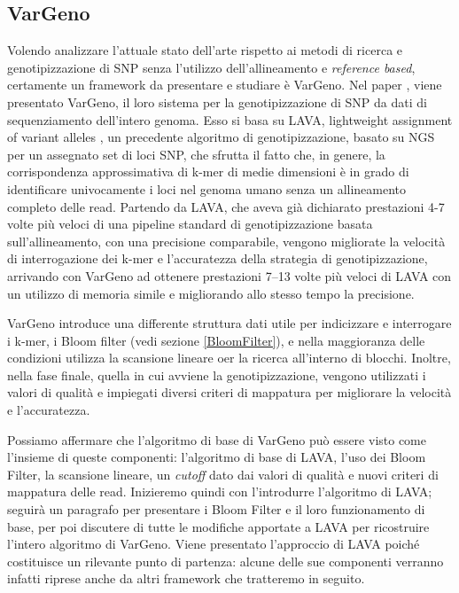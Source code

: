 \documentclass[../main.tex]{subfiles}
\begin{document}
\subsection{VarGeno}
\label{vargeno}
Volendo analizzare l'attuale stato dell'arte rispetto ai metodi di ricerca e genotipizzazione di SNP senza l'utilizzo dell'allineamento e \textit{reference based}, certamente un framework da presentare e studiare è VarGeno. Nel paper \cite{sun-medvedev2018vargeno}, viene presentato VarGeno, il loro sistema per la genotipizzazione di SNP da dati di sequenziamento dell'intero genoma. Esso si basa su LAVA, lightweight assignment of variant alleles \cite{shajii2016lava}, un precedente algoritmo di genotipizzazione, basato su NGS per un assegnato set di loci SNP, che sfrutta il fatto che, in genere, la corrispondenza approssimativa di k-mer di medie dimensioni è in grado di identificare univocamente i loci nel genoma umano senza un allineamento completo delle read. Partendo da LAVA, che aveva già dichiarato prestazioni 4-7 volte più veloci di una pipeline standard di genotipizzazione basata sull'allineamento, con una precisione comparabile, vengono migliorate la velocità di interrogazione dei k-mer e l'accuratezza della strategia di genotipizzazione, arrivando con VarGeno ad ottenere prestazioni 7–13 volte più veloci di LAVA con un utilizzo di memoria simile e migliorando allo stesso tempo la precisione.

VarGeno introduce una differente struttura dati utile per indicizzare e interrogare i k-mer, i Bloom filter (vedi sezione \ref{BloomFilter}), e nella maggioranza delle condizioni utilizza la scansione lineare oer la ricerca all'interno di blocchi. Inoltre, nella fase finale, quella in cui avviene la genotipizzazione, vengono utilizzati i valori di qualità e impiegati diversi criteri di mappatura per migliorare la velocità e l'accuratezza. 

Possiamo affermare che l'algoritmo di base di VarGeno può essere visto come l'insieme di queste componenti: l'algoritmo di base di LAVA, l'uso dei Bloom Filter, la scansione lineare, un \textit{cutoff} dato dai valori di qualità e nuovi criteri di mappatura delle read. Inizieremo quindi con l'introdurre l'algoritmo di LAVA; seguirà un paragrafo per presentare i Bloom Filter e il loro funzionamento di base, per poi discutere di tutte le modifiche apportate a LAVA per ricostruire l'intero algoritmo di VarGeno. Viene presentato l'approccio di LAVA poiché costituisce un rilevante punto di partenza: alcune delle sue componenti verranno infatti riprese anche da altri framework che tratteremo in seguito.
\end{document}
